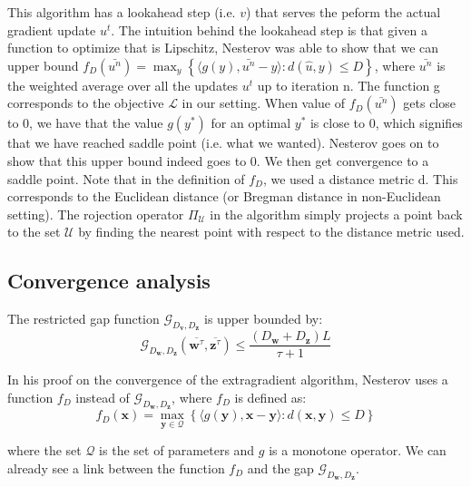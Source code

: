 \documentclass{article}
\renewcommand{\vec}{\mathbf}
\begin{document}
This algorithm has a lookahead step (i.e. $v$) that serves the peform the actual gradient update $u^t$. The intuition behind the lookahead step is that given a function to optimize that is Lipschitz, Nesterov was able to show that we can upper bound $f_{D}(\bar{u^n}) = \max_y \left \{ \langle g(y),\bar{u^n} - y \rangle : d(\hat{u},y) \leq D  \right \}$, where $\bar{u^n}$ is the weighted average  over all the updates $u^t$ up to iteration n. The function g corresponds to the objective $\mathcal{L}$ in our setting. When value of $f_D(\bar{u^n})$ gets close to 0, we have that the value $g(y^*)$ for an optimal $y^*$ is close to 0, which signifies that we have reached saddle point (i.e. what we wanted). Nesterov goes on to show that this upper bound indeed goes to 0. We then get convergence to a saddle point. Note that in the definition of $f_D$, we used a distance metric d. This corresponds to the Euclidean distance (or Bregman distance in non-Euclidean setting). The rojection operator $\Pi_{\mathcal{U}}$ in the algorithm simply projects a point back to the set $\mathcal{U}$ by finding the nearest point with respect to the distance metric used.

\subsection{Convergence analysis}
The restricted gap function $\mathcal{G}_{D_{\vec v}, D_{\vec z}}$ is upper bounded by:
\begin{equation}
  \mathcal{G}_{D_{\vec w}, D_{\vec z}}(\overline{\vec w^{\tau}}, \overline{\vec z^{\tau}}) \leq \frac{\left( D_{\vec w} + D_{\vec z} \right) L}{\tau + 1}
\end{equation}

In his proof on the convergence of the extragradient algorithm, Nesterov uses a function $f_D$ instead of $\mathcal{G}_{D_{\vec w}, D_{\vec z}}$, where $f_D$ is defined as:
\begin{equation}
f_D(\vec x) = \max_{\vec y \in \mathcal{Q}} \left \{ \langle g(\vec y), \vec x - \vec y \rangle : d(\vec x, \vec y) \leq D \right \}
\end{equation}

where the set $\mathcal{Q}$ is the set of parameters and $g$ is a monotone operator. We can already see a link between the function $f_D$ and the gap $\mathcal{G}_{D_{\vec w}, D_{\vec z}}$. 
\end{document}
